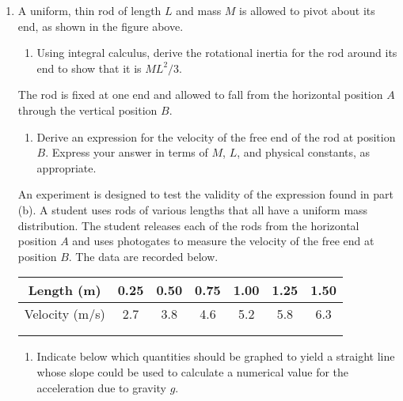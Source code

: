 \documentclass{../../../oss-apphys}
\begin{document}
\begin{center}
\end{center}
\begin{enumerate}[leftmargin=15pt]
\item A uniform, thin rod of length $L$ and mass $M$ is allowed to pivot about
  its end, as shown in the figure above.
  \begin{enumerate}[leftmargin=15pt]
  \item Using integral calculus, derive the rotational inertia for the rod
    around its end to show that it is $ML^2/3$.
  \end{enumerate}
  \begin{center}
  \end{center}
  The rod is fixed at one end and allowed to fall from the horizontal
  position $A$ through the vertical position $B$.
  \begin{enumerate}[leftmargin=15pt,resume]
  \item Derive an expression for the velocity of the free end of the rod at
    position $B$. Express your answer in terms of $M$, $L$, and physical
    constants, as appropriate.
  \end{enumerate}
  \newpage
  An experiment is designed to test the validity of the expression found in
  part (b). A student uses rods of various lengths that all have a uniform
  mass distribution. The student releases each of the rods from the horizontal
  position $A$ and uses photogates to measure the velocity of the free end at
  position $B$. The data are recorded below.
  \begin{center}
    \def\arraystretch{1.45}
    \begin{tabular}{|c|c|c|c|c|c|c|}
      \hline
      Length (m)     & 0.25 & 0.50 & 0.75 & 1.00 & 1.25 & 1.50\\\hline
      Velocity (m/s) & 2.7  & 3.8  & 4.6  & 5.2  & 5.8  & 6.3 \\\hline
      & & & & & & \\\hline
      & & & & & & \\\hline
    \end{tabular}
    \def\arraystretch{1}
  \end{center}

  \begin{enumerate}[leftmargin=15pt,resume]
  \item Indicate below which quantities should be graphed to yield a straight
    line whose slope could be used to calculate a numerical value for the
    acceleration due to gravity $g$.


\end{enumerate}
\end{enumerate}
\end{document}
